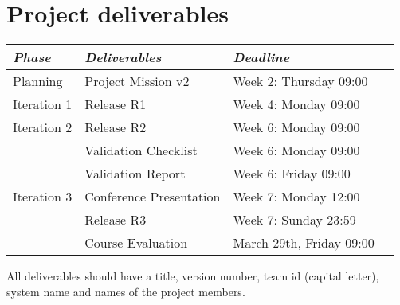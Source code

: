 \documentclass[10pt,a4paper]{article}
\begin{document}
\section{Project deliverables}
\begin{tabular}{l |l p{5cm}  l}
{\it Phase} & {\it Deliverables} & {\it Deadline} \\
\hline
Planning & Project Mission v2& Week 2: Thursday 09:00\\
Iteration 1 & Release R1 & Week 4: Monday 09:00 \\
Iteration 2 & Release R2  & Week 6: Monday 09:00\\
   & Validation Checklist & Week 6: Monday 09:00\\
   & Validation Report & Week 6: Friday 09:00\\
Iteration 3 & Conference Presentation & Week 7: Monday 12:00\\
   & Release R3 & Week 7: Sunday 23:59\\
   & Course Evaluation & March 29th, Friday 09:00  \\

\end{tabular}
\vskip3mm

\noindent All deliverables should have a title, version number, team id (capital letter), system name and names of the project members.
%
%
%
%
%
\end{document}

